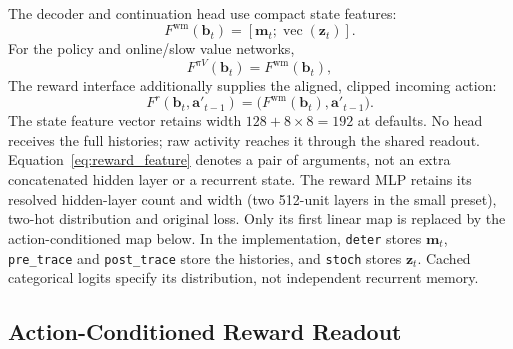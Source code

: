 \documentclass{article}
\begin{document}
The decoder and continuation head use compact state features:
\begin{equation}
F^{\mathrm{wm}}(\mathbf b_t)=[\mathbf m_t;\operatorname{vec}(\mathbf z_t)].
\label{eq:latent_feature}
\end{equation}
For the policy and online/slow value networks,
\begin{equation}
F^{\pi V}(\mathbf b_t)=F^{\mathrm{wm}}(\mathbf b_t),
\label{eq:control_feature}
\end{equation}
The reward interface additionally supplies the aligned, clipped incoming action:
\begin{equation}
F^r(\mathbf b_t,\mathbf a'_{t-1})=
\big(F^{\mathrm{wm}}(\mathbf b_t),\mathbf a'_{t-1}\big).
\label{eq:reward_feature}
\end{equation}
The state feature vector retains width $128+8\times8=192$ at defaults. No head receives the full histories; raw activity reaches it through the shared readout. Equation~\eqref{eq:reward_feature} denotes a pair of arguments, not an extra concatenated hidden layer or a recurrent state. The reward MLP retains its resolved hidden-layer count and width (two 512-unit layers in the small preset), two-hot distribution and original loss. Only its first linear map is replaced by the action-conditioned map below. In the implementation, \texttt{deter} stores $\mathbf m_t$, \texttt{pre\_trace} and \texttt{post\_trace} store the histories, and \texttt{stoch} stores $\mathbf z_t$. Cached categorical logits specify its distribution, not independent recurrent memory.

\subsection{Action-Conditioned Reward Readout}
\end{document}
